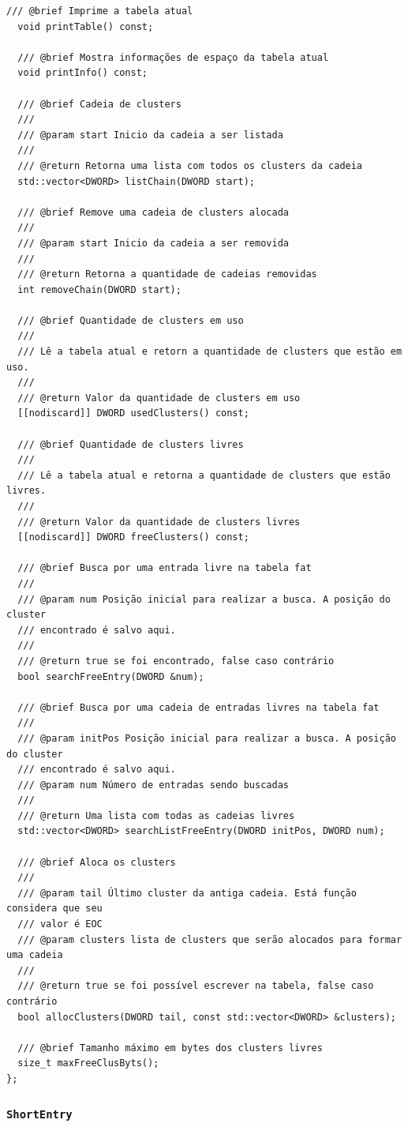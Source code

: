 \documentclass[
    12pt,				%
    oneside,   	        %
    a4paper,			%
    english,			%
    french,				%
    spanish,			%
    brazil,				%
    ]{pacotes/abntex2}
\begin{document}
\begin{lstlisting}[caption={Classe a estrutura FAT}, label={lst:fat_table}]
  /// @brief Imprime a tabela atual
  void printTable() const;

  /// @brief Mostra informações de espaço da tabela atual
  void printInfo() const;

  /// @brief Cadeia de clusters
  ///
  /// @param start Inicio da cadeia a ser listada
  ///
  /// @return Retorna uma lista com todos os clusters da cadeia
  std::vector<DWORD> listChain(DWORD start);

  /// @brief Remove uma cadeia de clusters alocada
  ///
  /// @param start Inicio da cadeia a ser removida
  ///
  /// @return Retorna a quantidade de cadeias removidas
  int removeChain(DWORD start);

  /// @brief Quantidade de clusters em uso
  ///
  /// Lê a tabela atual e retorn a quantidade de clusters que estão em uso.
  ///
  /// @return Valor da quantidade de clusters em uso
  [[nodiscard]] DWORD usedClusters() const;

  /// @brief Quantidade de clusters livres
  ///
  /// Lê a tabela atual e retorna a quantidade de clusters que estão livres.
  ///
  /// @return Valor da quantidade de clusters livres
  [[nodiscard]] DWORD freeClusters() const;

  /// @brief Busca por uma entrada livre na tabela fat
  ///
  /// @param num Posição inicial para realizar a busca. A posição do cluster
  /// encontrado é salvo aqui.
  ///
  /// @return true se foi encontrado, false caso contrário
  bool searchFreeEntry(DWORD &num);

  /// @brief Busca por uma cadeia de entradas livres na tabela fat
  ///
  /// @param initPos Posição inicial para realizar a busca. A posição do cluster
  /// encontrado é salvo aqui.
  /// @param num Número de entradas sendo buscadas
  ///
  /// @return Uma lista com todas as cadeias livres
  std::vector<DWORD> searchListFreeEntry(DWORD initPos, DWORD num);

  /// @brief Aloca os clusters
  ///
  /// @param tail Último cluster da antiga cadeia. Está função considera que seu
  /// valor é EOC
  /// @param clusters lista de clusters que serão alocados para formar uma cadeia
  ///
  /// @return true se foi possível escrever na tabela, false caso contrário
  bool allocClusters(DWORD tail, const std::vector<DWORD> &clusters);

  /// @brief Tamanho máximo em bytes dos clusters livres
  size_t maxFreeClusByts();
};
\end{lstlisting}

\subsubsection{\texttt{ShortEntry}}
\label{subsubsec:short_entry}
\end{document}
